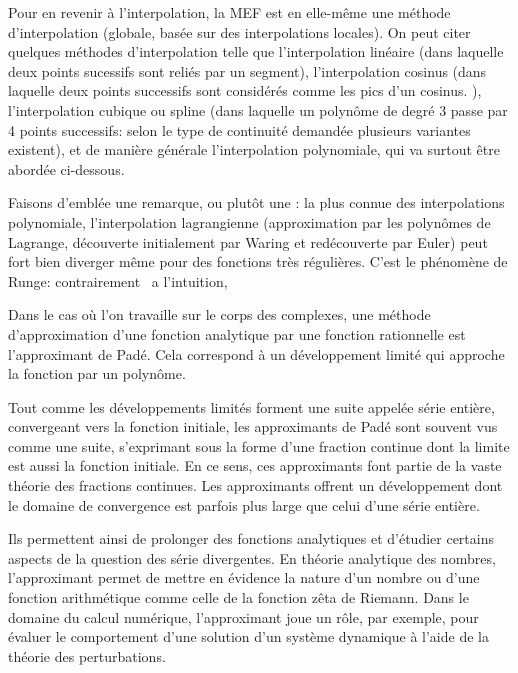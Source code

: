 \medskip
Pour en revenir à l'interpolation, la MEF est en elle-même une méthode d'interpolation (globale,
basée sur des interpolations locales).
On peut citer quelques méthodes d'interpolation telle que l'interpolation linéaire (dans laquelle deux points
sucessifs sont reliés par un segment), l'interpolation cosinus (dans laquelle deux points successifs sont
considérés comme les pics d'un cosinus. ), l'interpolation cubique ou spline (dans laquelle un polynôme
de degré 3 passe par 4 points successifs: selon le type de continuité demandée plusieurs variantes
existent), et de manière générale l'interpolation polynomiale, qui va surtout être abordée
ci-dessous.

\medskip
Faisons d'emblée une remarque, ou plutôt une : 
la plus connue des interpolations polynomiale, l'interpolation lagrangienne (approximation par les 
polynômes de Lagrange, 
découverte initialement par Waring et redécouverte par 
Euler) peut fort bien diverger  même pour des fonctions 
très régulières.
C'est le phénomène de Runge: 
contrairement \ a l'intuition, 

\medskip
{} Dans le cas où l'on travaille sur le corps des complexes,  une méthode d'approximation 
d'une fonction analytique par une fonction rationnelle est l'approximant de Padé. 
Cela correspond à un développement limité qui approche la fonction par un polynôme.

Tout comme les développements limités forment une suite appelée série entière, convergeant
 vers la fonction initiale, les approximants de Padé sont souvent vus comme une suite, s'exprimant sous la forme 
d'une fraction continue dont la limite est aussi la fonction initiale. En ce sens, ces approximants font partie de 
la vaste théorie des fractions continues.
Les approximants offrent un développement dont le domaine de convergence est parfois plus large que celui 
d'une série entière. 

Ils permettent ainsi de prolonger des fonctions analytiques et d'étudier certains aspects de la question des 
série divergentes.
En théorie analytique des nombres, l'approximant permet de mettre en évidence la nature d'un nombre ou 
d'une fonction arithmétique comme celle de la fonction zêta de Riemann. 
Dans le domaine du calcul numérique, l'approximant joue un rôle, par exemple, pour évaluer le comportement 
d'une solution d'un système dynamique à l'aide de la théorie des perturbations.


